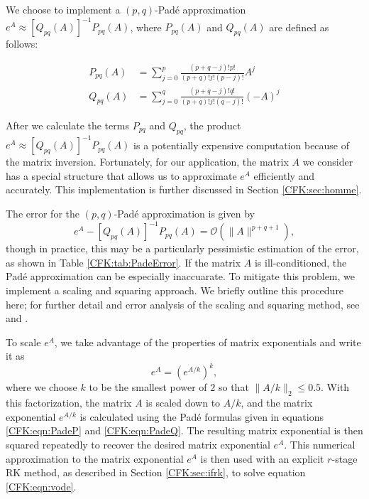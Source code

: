 \documentclass{csri19}
\begin{document}
We choose to implement a $(p,q)$-Pad\'e approximation 
$e^{A}\approx \left[Q_{pq}(A)\right]^{-1}P_{pq}(A)$, where $P_{pq}(A)$ and 
$Q_{pq}(A)$ are defined as follows:

\begin{align}
\label{CFK:eqn:PadeP}
P_{pq}(A) &= \sum_{j=0}^p\frac{(p+q-j)!p!}{(p+q)!j!(p-j)!}A^j\\
\label{CFK:eqn:PadeQ}
Q_{pq}(A) &= \sum_{j=0}^q\frac{(p+q-j)!q!}{(p+q)!j!(q-j)!}(-A)^j
\end{align}

After we calculate the terms $P_{pq}$ and $Q_{pq}$, the product 
$e^A\approx\left[Q_{pq}(A)\right]^{-1}P_{pq}(A)$ is a potentially expensive 
computation because of the matrix inversion. Fortunately, for our 
application, the matrix $A$ we consider has a special structure that allows 
us to approximate $e^A$ efficiently and accurately. This implementation is 
further discussed in Section \ref{CFK:sec:homme}.

The error for the $(p,q)$-Pad\'e approximation is given by
\[e^A-\left[Q_{pq}(A)\right]^{-1}P_{pq}(A) = \mathcal{O}(\|A\|^{p+q+1}),\] 
though in practice, this may be a particularly pessimistic estimation of 
the error, as shown in Table \ref{CFK:tab:PadeError}. If the matrix $A$ is 
ill-conditioned, the Pad\'e  approximation can be especially inaccuarate. 
To mitigate this problem, we implement a scaling and squaring approach. We 
briefly outline this procedure here; for further detail and error analysis 
of the scaling and squaring method, see \cite{CFK:higham2005} and 
\cite{CFK:Al-Mohy2009}. 

To scale $e^A$, we take advantage of the properties of matrix exponentials 
and write it as
\[e^{A} = \left(e^{A/k}\right)^k,\]
where we choose $k$ to be the smallest power of $2$ so that $\|A/k\|_2
\leq 0.5$. With this factorization, the matrix $A$ is scaled down to $A/k$, 
and the matrix exponential $e^{A/k}$ is calculated using the Pad\'e 
formulas given in equations \ref{CFK:eqn:PadeP} and \ref{CFK:eqn:PadeQ}. 
The resulting matrix exponential is then squared repeatedly to recover the 
desired matrix exponential $e^{A}$. This numerical approximation to the 
matrix exponential $e^A$ is then used with an explicit $r$-stage RK method, 
as described in Section \ref{CFK:sec:ifrk}, to solve equation 
\ref{CFK:eqn:vode}.
\end{document}
